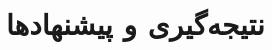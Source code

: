 \documentclass[12pt, a4paper]{article}
\begin{document}
 
%			


\FloatBarrier

\section{نتیجه‌گیری و پیشنهاد‌ها}

\begin{LTR}		
	
	
\end{LTR}
\end{document}
